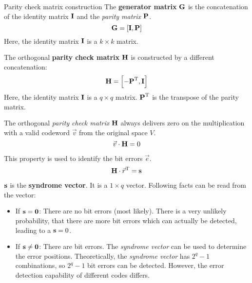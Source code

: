 \begin{refsection}
\begin{definition}{Parity check matrix construction}
	The  \textbf{generator matrix} $\bm{\mathrm{G}}$ is the concatenation of the identity matrix $\bm{\mathrm{\mathrm{I}}}$ and the \emph{parity matrix} $\bm{\mathrm{P}}$.
	\begin{equation}
		\bm{\mathrm{G}} = \left[\bm{\mathrm{\mathrm{I}}}, \bm{\mathrm{P}}\right]
	\end{equation}
	Here, the identity matrix $\bm{\mathrm{\mathrm{I}}}$ is a $k \times k$ matrix.
	
	\vspace{1em}

	The orthogonal  \textbf{parity check matrix} $\bm{\mathrm{H}}$ is constructed by a different concatenation:
	\begin{equation}
		\bm{\mathrm{H}} = \left[-\bm{\mathrm{P}}^{\mathrm{T}}, \bm{\mathrm{\mathrm{I}}}\right]
	\end{equation}
	Here, the identity matrix $\bm{\mathrm{\mathrm{I}}}$ is a $q \times q$ matrix. $\bm{\mathrm{P}}^{\mathrm{T}}$ is the transpose of the parity matrix.
\end{definition}

The orthogonal \emph{parity check matrix} $\bm{\mathrm{H}}$ always delivers zero on the multiplication with a valid codeword $\vec{v}$ from the original space $V$.
\begin{equation}
	\vec{v} \cdot \bm{\mathrm{H}} = 0
\end{equation}

This property is used to identify the bit errors $\vec{e}$.
\begin{equation}
	\bm{\mathrm{H}} \cdot \vec{r}^{\mathrm{T}} = \bm{\mathrm{s}}
\end{equation}

$\bm{\mathrm{s}}$ is the  \textbf{syndrome vector}. It is a $1 \times q$ vector. Following facts can be read from the vector:
\begin{itemize}
	\item If $\bm{\mathrm{s}} = \bm{\mathrm{\mathrm{0}}}$: There are no bit errors (most likely). There is a very unlikely probability, that there are more bit errors which can actually be detected, leading to a $\bm{\mathrm{s}} = 0$.
	\item If $\bm{\mathrm{s}} \neq \bm{\mathrm{\mathrm{0}}}$: There are bit errors. The \emph{syndrome vector} can be used to determine the error positions. Theoretically, the \emph{syndrome vector} has $2^q - 1$ combinations, so $2^q - 1$ bit errors can be detected. However, the error detection capability of different codes differs.
\end{itemize}


\end{refsection}
